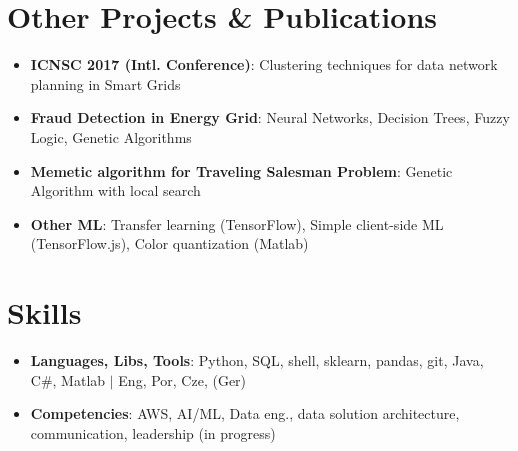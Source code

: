 \documentclass[a4paper,11pt]{article}
\newcommand{\myHrefIcn}[2]{#2 \href{#1}{\scriptsize{\faExternalLink{}}}}
\newcommand{\resumeItem}[2]{
  \item\small{
    \textbf{#1}{: #2 \vspace{-2pt}}
  }
}
\newcommand{\resumeSubItem}[2]{\resumeItem{#1}{#2}\vspace{-4pt}}
\newcommand{\resumeSubHeadingListStart}{\begin{itemize}[leftmargin=*]}
\newcommand{\resumeSubHeadingListEnd}{\end{itemize}}
\newcommand{\csharp}{C\#}
\begin{document}
\section{Other Projects \& Publications}
  \resumeSubHeadingListStart
    \resumeSubItem{%
        \textbf{%
            \myHrefIcn{http://icnsc2017.dimes.unical.it/}{ICNSC 2017} (Intl. Conference)}}
        {\myHrefIcn{https://ieeexplore.ieee.org/document/8000059/}{Clustering techniques for data network planning in Smart Grids}}
    \resumeSubItem{Fraud Detection in Energy Grid}%
        {Neural Networks, Decision Trees, Fuzzy Logic, Genetic Algorithms}
    \resumeSubItem{Memetic algorithm for Traveling Salesman Problem}{Genetic Algorithm with local search}
    \resumeSubItem{Other ML}
        {Transfer learning (TensorFlow), Simple client-side ML (TensorFlow.js), Color quantization (Matlab)}
  \resumeSubHeadingListEnd

\vspace{-4pt}

\section{Skills}
  \resumeSubHeadingListStart
    \resumeSubItem{Languages, Libs, Tools}{Python, SQL, shell, sklearn, pandas, git, Java, \csharp, Matlab $\vert$ Eng, Por, Cze, (Ger)}
    \resumeSubItem{Competencies}{AWS, AI/ML, Data eng., data solution architecture, communication, leadership (in progress)}%
    
  \resumeSubHeadingListEnd

\vspace{-4pt}

\end{document}
